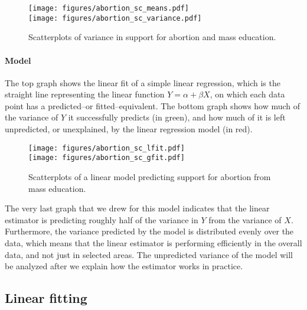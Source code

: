 \begin{figure}[htp]
	\centering
	\texttt{[image: figures/abortion\_sc\_means.pdf]}\\
	\texttt{[image: figures/abortion\_sc\_variance.pdf]}

	\caption[Support for abortion and mass education (1): Variance]{\label{fig:model_quadrant_top}
	Scatterplots of variance in support for abortion and mass education.\\
	\mlines{} }
\end{figure}%

\paragraph{Model} The top graph shows the linear fit of a simple linear regression, which is the straight line representing the linear function $Y = \alpha + \beta X$, on which each data point has a predicted--or fitted--equivalent. The bottom graph shows how much of the variance of $Y$ it successfully predicts (in green), and how much of it is left unpredicted, or unexplained, by the linear regression model (in red).

\begin{figure}[htp]
	\centering
	\texttt{[image: figures/abortion\_sc\_lfit.pdf]}\\
	\texttt{[image: figures/abortion\_sc\_gfit.pdf]}

	\caption[Support for abortion and mass education (2): Model]{\label{fig:model_quadrant_bottom}
	Scatterplots of a linear model predicting support for abortion from mass education.\\
	\mlines{} }
\end{figure}%

The very last graph that we drew for this model indicates that the linear estimator is predicting roughly half of the variance in $Y$ from the variance of $X$. Furthermore, the variance predicted by the model is distributed evenly over the data, which means that the linear estimator is performing efficiently in the overall data, and not just in selected areas. The unpredicted variance of the model will be analyzed after we explain how the estimator works in practice.

	\subsection{Linear fitting}

